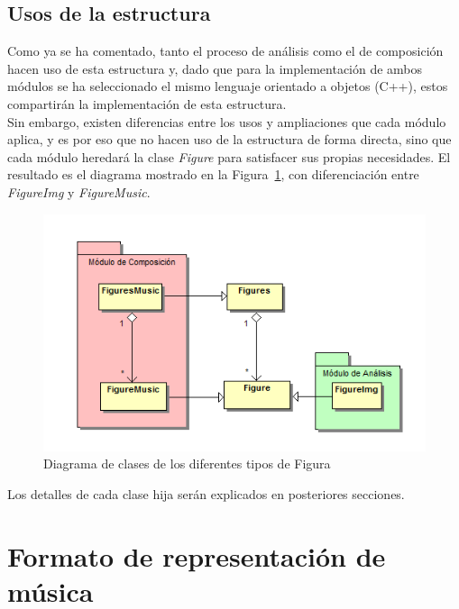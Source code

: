 			
\subsection{Usos de la estructura}	

	Como ya se ha comentado, tanto el proceso de análisis como el de composición hacen uso de esta estructura y, dado que para la implementación de ambos módulos se ha seleccionado el mismo lenguaje orientado a objetos (C++), estos compartirán la implementación de esta estructura.\\
	
	Sin embargo, existen diferencias entre los usos y ampliaciones que cada módulo aplica, y es por eso que no hacen uso de la estructura de forma directa,  sino que cada módulo heredará la clase \emph{Figure} para satisfacer sus propias necesidades. El resultado es el diagrama mostrado en la Figura~\ref{fig:diagramaFigMupPhic}, con diferenciación entre \emph{FigureImg} y \emph{FigureMusic}.\\

		\begin{figure}[htbp]
		\centering
		\includegraphics[scale=0.5]{graphics/diagramaFigMupPhic.png}
		\caption{Diagrama de clases de los diferentes tipos de Figura}
		\label{fig:diagramaFigMupPhic}
		\end{figure}
		
	Los detalles de cada clase hija serán explicados en posteriores secciones.	


\section{Formato de representación de música}


